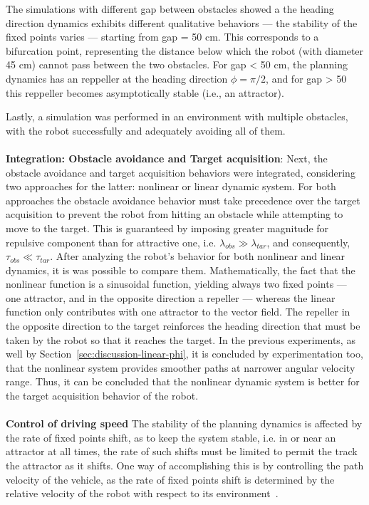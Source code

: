 The simulations with different gap between obstacles showed a
the heading direction dynamics
exhibits different qualitative behaviors --- the stability of the fixed
points varies --- starting from gap = 50 cm. This corresponds to a bifurcation
point, representing the distance below which the robot
(with diameter 45 cm) cannot pass between the two obstacles. For gap < 50 cm, the planning dynamics has an reppeller
at the heading direction $\phi = \pi/2$, and for gap > 50 this reppeller becomes
asymptotically stable (i.e., an attractor). 

Lastly, a simulation was performed
in an environment with multiple obstacles, with the robot successfully and
adequately avoiding all of them.
\\\\
\textbf{Integration: Obstacle avoidance and Target acquisition}:
Next, the obstacle avoidance and target acquisition behaviors were integrated,
considering two approaches for the latter: nonlinear or linear dynamic
system. For both approaches the obstacle avoidance behavior must take precedence over the target acquisition
to prevent the robot from hitting an obstacle while attempting to move to the
target. This is guaranteed by imposing greater magnitude for repulsive component than for
attractive one, i.e. $\lambda_{obs} \gg \lambda_{tar}$, and consequently,
$\tau_{obs} \ll \tau_{tar}$.
After analyzing the robot's behavior for both nonlinear and linear dynamics, it
is was possible to compare them.
Mathematically, the fact that the nonlinear function is a sinusoidal function, yielding always
two fixed points --- one attractor, and in the opposite direction a
repeller --- whereas the linear function only contributes with one attractor to
the vector field. 
The repeller in the opposite direction to the target reinforces the heading direction that must be taken by the robot so that it reaches the target.
In the previous experiments, as well by Section~\ref{sec:discussion-linear-phi},
it is concluded by experimentation too, that the nonlinear system provides smoother paths at narrower angular velocity range.
Thus, it can be concluded that the nonlinear dynamic system is better for the target acquisition behavior of the robot. 
%
\\\\
\textbf{Control of driving speed}
The stability of the planning dynamics is affected by the rate of fixed points
shift, as to keep the system stable, i.e. in or near an attractor at all times, the rate of such
shifts must be limited to permit the track the attractor as it shifts. One way
of accomplishing this is by controlling the path velocity of the vehicle, as the
rate of fixed points shift is determined by the relative velocity of the robot
with respect to its environment~\cite{bicho2000dynamic}.

